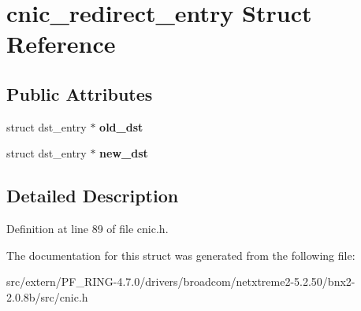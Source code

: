 \hypertarget{structcnic__redirect__entry}{
\section{cnic\_\-redirect\_\-entry Struct Reference}
\label{structcnic__redirect__entry}
}
\subsection*{Public Attributes}
\begin{DoxyCompactItemize}
\item 
\hypertarget{structcnic__redirect__entry_ab2e965c7e9b7825cc4ca073d7373ff69}{
struct dst\_\-entry $\ast$ {\bfseries old\_\-dst}}
\label{structcnic__redirect__entry_ab2e965c7e9b7825cc4ca073d7373ff69}

\item 
\hypertarget{structcnic__redirect__entry_a693af54f2dc33c5a4dea831897640c84}{
struct dst\_\-entry $\ast$ {\bfseries new\_\-dst}}
\label{structcnic__redirect__entry_a693af54f2dc33c5a4dea831897640c84}

\end{DoxyCompactItemize}


\subsection{Detailed Description}


Definition at line 89 of file cnic.h.



The documentation for this struct was generated from the following file:\begin{DoxyCompactItemize}
\item 
src/extern/PF\_\-RING-\/4.7.0/drivers/broadcom/netxtreme2-\/5.2.50/bnx2-\/2.0.8b/src/cnic.h\end{DoxyCompactItemize}
